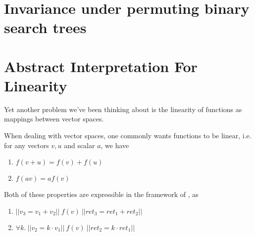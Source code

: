 \documentclass{llncs}
\begin{document}
\iffalse %
\subsection{Programs}
The previous section indicates a method for verifying
robustness of more general programs under permutation of inputs. 
Given a procedure $F$ taking an array as argument, consider the functions $F_\alpha$, which first swaps the first two elements of the array, then computes $F$, and $F_\beta$, which moves the first element of the array to the back, then computes $F$. Then $F$ is invariant under permutation of its input if and only if $F$ is functionally equivalent to $F_\alpha$ and $F_\beta$.

Certainly this method is more efficient than checking invariance under a larger class of permutations. For DFAs, this simplification made the problem of permutation invariance solvable. This indicates that this simplification may aid in our analysis in a profound way. For example, this may be a much easier way of verifying this invariance compared to expressing permutations as a general $2$-safety property.
\fi

\section{Invariance under permuting binary search trees}

\iffalse %
\section{Abstract Interpretation For Linearity}
Yet another problem we've been thinking about is the linearity of functions as mappings between vector spaces.

When dealing with vector spaces, one commonly wants functions to be linear, i.e. for any vectors $v,u$ and scalar $a$, we have
\begin{enumerate}
	\item $f(v+u) = f(v) + f(u)$
    \item $f(av) = af(v)$
\end{enumerate}
Both of these properties are expressible in the framework of \cite{sousa16}, as
\begin{enumerate}
	\item $||v_3 = v_1 + v_2||\ f(v)\ ||ret_3 = ret_1+ret_2||$
    \item $\forall k.\ ||v_2 = k\cdot v_1 ||\ f(v)\ 
    	||ret_2 = k\cdot ret_1||$
\end{enumerate}
\end{document}
